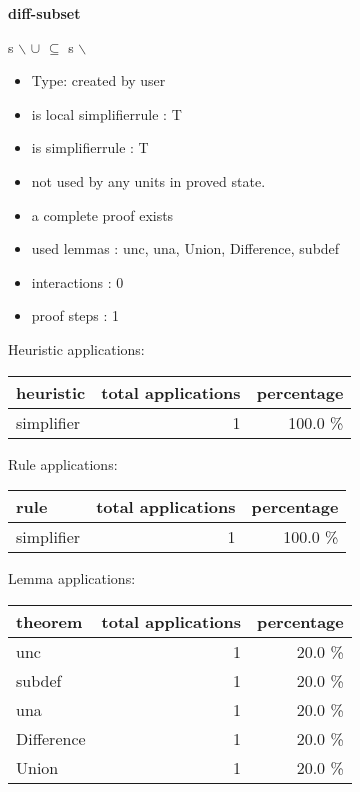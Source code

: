 \documentclass[a4paper]{article}
\begin{document}
{\LARGE\bf diff-subset}\label{lemma-diff-subset}

\medskip

 \Fol s $\backslash$  $\cup$  $\subseteq$ s $\backslash$ 

\begin{itemize}

\item Type: created by user

\item is local simplifierrule : T
\item is simplifierrule : T
\item not used by any units in proved state.
\item       a complete proof exists
\item       used lemmas  : unc, una, Union, Difference, subdef
\item       interactions : 0
\item       proof steps  : 1
\end{itemize}

\medskip


Heuristic applications:

\begin{supertabular}{l|r|r}
heuristic	& total applications & percentage \\ \hline
simplifier & 1 & 100.0 \% \\

\end{supertabular}

Rule applications:

\begin{supertabular}{l|r|r}
rule	        & total applications & percentage \\ \hline
simplifier & 1 & 100.0 \% \\

\end{supertabular}

Lemma applications:

\begin{supertabular}{l|r|r}
theorem	        & total applications & percentage \\ \hline
unc & 1 & 20.0 \% \\
subdef & 1 & 20.0 \% \\
una & 1 & 20.0 \% \\
Difference & 1 & 20.0 \% \\
Union & 1 & 20.0 \% \\

\end{supertabular}
\pagebreak
\end{document}
